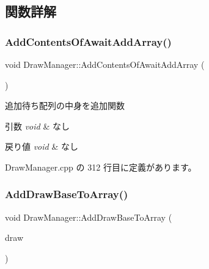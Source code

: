 \subsection{関数詳解}
\mbox{\label{class_draw_manager_a984cd9de288151fd1d170f80f93a11e8}} 
\subsubsection{\texorpdfstring{Add\+Contents\+Of\+Await\+Add\+Array()}{AddContentsOfAwaitAddArray()}}
{\footnotesize\ttfamily void Draw\+Manager\+::\+Add\+Contents\+Of\+Await\+Add\+Array (\begin{DoxyParamCaption}{ }\end{DoxyParamCaption})\hspace{0.3cm}{\ttfamily [private]}}



追加待ち配列の中身を追加関数 


\begin{DoxyParams}{引数}
{\em void} & なし \\
\hline
\end{DoxyParams}

\begin{DoxyRetVals}{戻り値}
{\em void} & なし \\
\hline
\end{DoxyRetVals}


 Draw\+Manager.\+cpp の 312 行目に定義があります。

\mbox{\label{class_draw_manager_a9dbd645fdbf927cd43d400335ff9b286}} 
\subsubsection{\texorpdfstring{Add\+Draw\+Base\+To\+Array()}{AddDrawBaseToArray()}}
{\footnotesize\ttfamily void Draw\+Manager\+::\+Add\+Draw\+Base\+To\+Array (\begin{DoxyParamCaption}\item[{\mbox{\hyperlink{class_draw_base}{Draw\+Base}} $\ast$}]{draw }\end{DoxyParamCaption})}



